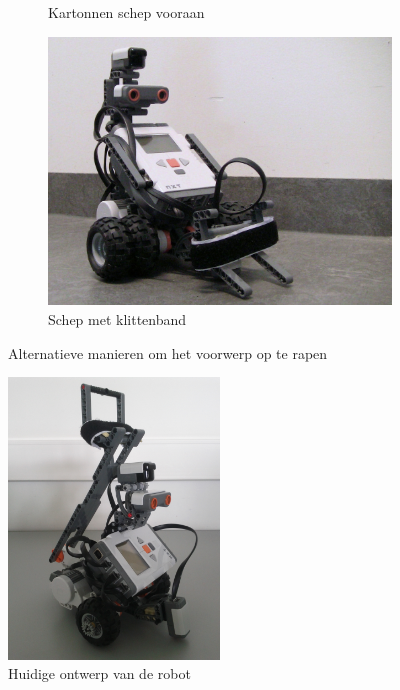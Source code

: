 \documentclass[eind]{penoverslag}
\begin{document}
\begin{figure}
\begin{subfigure}[h]{0.325\textwidth}
		\caption{Kartonnen schep vooraan}
		\label{fig:robotOud2}
	\end{subfigure}
	\begin{subfigure}[h]{0.325\textwidth}
		\centering
		\includegraphics[width=\textwidth]{robotOud3}
		\caption{Schep met klittenband}
		\label{fig:robotOud3}
	\end{subfigure}
\caption{Alternatieve manieren om het voorwerp op te rapen}
\label{fig:robotOud}
\end{figure}

\begin{figure}
\centering
	\includegraphics[width=0.5\textwidth]{robotNieuw}
\caption{Huidige ontwerp van de robot}
\label{fig:robotBouw}
\end{figure}
\end{document}
